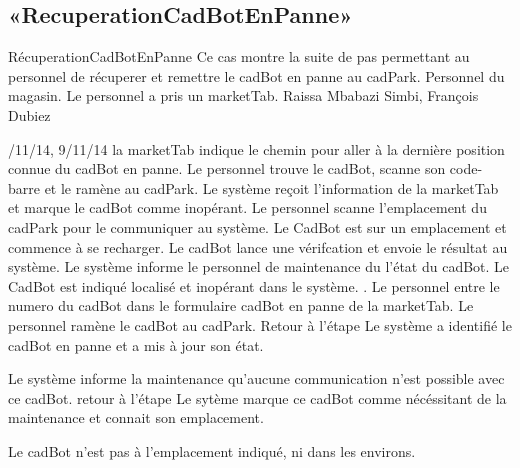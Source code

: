 \subsection{«RecuperationCadBotEnPanne»}
\startCU
\nom RécuperationCadBotEnPanne
\but Ce cas montre la suite de pas permettant au personnel de récuperer et remettre le cadBot en panne au cadPark.
\acteur Personnel du magasin.
\precondition Le personnel a pris un marketTab.
\auteur Raissa Mbabazi Simbi, François Dubiez
\date 7/11/14, 9/11/14
\nominal %
\startnominal
{} la marketTab indique le chemin pour aller à la dernière position connue du cadBot en panne.
\etape[RCP:SE1] Le personnel trouve le cadBot, scanne son code-barre et le ramène au cadPark.
\etape Le système reçoit l'information de la marketTab et marque le cadBot comme inopérant.
\etape Le personnel scanne l'emplacement du cadPark pour le communiquer au système.
 Le CadBot est sur un emplacement et commence à se recharger.
 Le cadBot lance une vérifcation et envoie le résultat au système. 
\etape Le système informe le personnel de maintenance du l'état du cadBot.
\stopnominal
\postcondition Le CadBot est indiqué localisé et inopérant dans le système.
.
\alternatifs
\startalternatif[RCP:SE1]
\etape Le personnel entre le numero du cadBot dans le formulaire cadBot en panne de la marketTab.
\etape Le personnel ramène le cadBot au cadPark.
\etape Retour à l'étape 
\stopcondition
\postcondition Le système a identifié le cadBot en panne et a mis à jour son état.
\stopalternatif


\etape Le système informe la maintenance qu'aucune communication n'est possible avec ce cadBot.
\etape retour à l'étape 
\stopcondition
\postcondition Le sytème marque ce cadBot comme nécéssitant de la maintenance et connait son emplacement.
\stopalternatif


\exception
Le cadBot n'est pas à l'emplacement indiqué, ni dans les environs.
\stopCU
